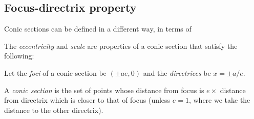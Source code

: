 \documentclass[a4paper]{article}
\begin{document}
\subsection{Focus-directrix property}
Conic sections can be defined in a different way, in terms of
\begin{defi}
  The \emph{eccentricity} and \emph{scale} are properties of a conic section that satisfy the following:

  Let the \emph{foci} of a conic section be $(\pm ae, 0)$ and the \emph{directrices} be $x = \pm a/e$.

  A \emph{conic section} is the set of points whose distance from focus is $e \times$ distance from directrix which is closer to that of focus (unless $e = 1$, where we take the distance to the other directrix).
\end{defi}
\end{document}
